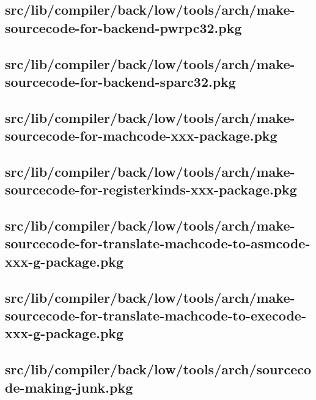\subsection{src/lib/compiler/back/low/tools/arch/make-sourcecode-for-backend-pwrpc32.pkg}


\subsection{src/lib/compiler/back/low/tools/arch/make-sourcecode-for-backend-sparc32.pkg}


\subsection{src/lib/compiler/back/low/tools/arch/make-sourcecode-for-machcode-xxx-package.pkg}


\subsection{src/lib/compiler/back/low/tools/arch/make-sourcecode-for-registerkinds-xxx-package.pkg}


\subsection{src/lib/compiler/back/low/tools/arch/make-sourcecode-for-translate-machcode-to-asmcode-xxx-g-package.pkg}


\subsection{src/lib/compiler/back/low/tools/arch/make-sourcecode-for-translate-machcode-to-execode-xxx-g-package.pkg}


\subsection{src/lib/compiler/back/low/tools/arch/sourcecode-making-junk.pkg}


